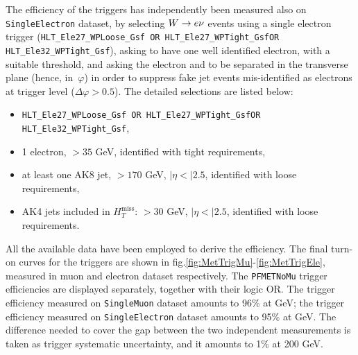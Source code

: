 \vspace*{1\baselineskip}

\noindent The efficiency of the \MET triggers has independently been measured also on {\tt SingleElectron} dataset, by selecting $W \rightarrow e \nu$ events using a single electron trigger ({\tt HLT\_Ele27\_WPLoose\_Gsf OR HLT\_Ele27\_WPTight\_GsfOR HLT\_Ele32\_WPTight\_Gsf}), asking to have one well identified electron, with a suitable \pt threshold, and asking the electron and \met to be separated in the transverse plane (hence, in~$\varphi$) in order to suppress fake jet events mis-identified as electrons at trigger level ($\Delta \varphi > 0.5$). The detailed selections are listed below:
\begin{itemize}
\item {\tt HLT\_Ele27\_WPLoose\_Gsf OR HLT\_Ele27\_WPTight\_GsfOR HLT\_Ele32\_WPTight\_Gsf},
\item 1 electron, \pt$>35$ GeV, identified with tight requirements,
\item at least one AK8 jet, \pt$>170$ GeV, $|\eta<|2.5$, identified with loose requirements,
\item AK4 jets included in ${H}_T^{\text{miss}}$: \pt$>30$ GeV, $|\eta<|2.5$, identified with loose requirements.
\end{itemize}

\noindent All the available data have been employed to derive the efficiency. The final turn-on curves for the \MET triggers are shown in fig.\ref{fig:MetTrigMu}-\ref{fig:MetTrigEle}, measured in muon and electron dataset respectively. The {\tt PFMETNoMu} trigger efficiencies are displayed separately, together with their logic OR. The trigger efficiency measured on {\tt SingleMuon} dataset amounts to 96\% at  GeV; the trigger efficiency measured on {\tt SingleElectron} dataset amounts to 95\% at  GeV. The difference needed to cover the gap between the two independent measurements is taken as trigger systematic uncertainty, and it amounts to 1\% at 200 GeV.

